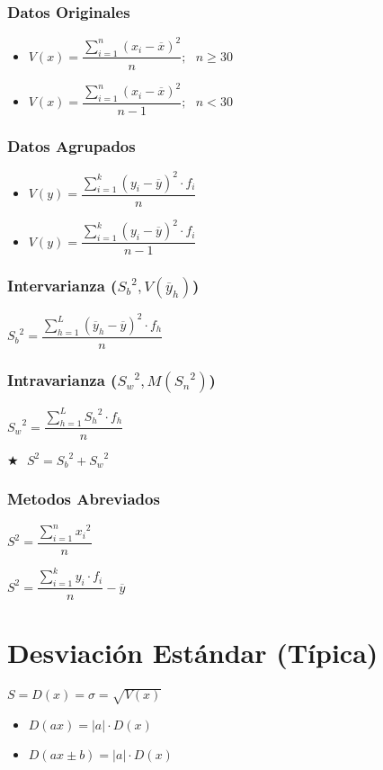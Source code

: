 \documentclass[10pt,letterpaper]{article}
\begin{document}
\begin{multicols}{3}
\subsubsection*{Datos Originales}
\begin{itemize}
\item $V(x)=\dfrac{\displaystyle\sum_{i=1}^{n}(x_i-\overline{x})^2}{n}; \text{ }n\geq 30$
\item $V(x)=\dfrac{\displaystyle\sum_{i=1}^{n}(x_i-\overline{x})^2}{n-1}; \text{ }n <30$
\end{itemize}
\columnbreak
\subsubsection*{Datos Agrupados}
\begin{itemize}
\item $V(y)=\dfrac{\displaystyle\sum_{i=1}^{k}(y_i-\overline{y})^2\cdot f_i}{n}$
\item $V(y)=\dfrac{\displaystyle\sum_{i=1}^{k}(y_i-\overline{y})^2\cdot f_i}{n-1}$
\end{itemize}
\columnbreak
\subsubsection*{Intervarianza (${S_b}^2,V(\overline{y}_h)$)}
${S_b}^2=\dfrac{\displaystyle\sum_{h=1}^{L}(\overline{y}_h-\overline{y})^2\cdot f_h}{n}$
\subsubsection*{Intravarianza (${S_w}^2,M({S_n}^2)$)}
${S_w}^2=\dfrac{\displaystyle\sum_{h=1}^{L}{S_h}^2\cdot f_h}{n}$
\end{multicols}
$\bigstar\text{   } S^2={S_b}^2+{S_w}^2$
\subsubsection*{Metodos Abreviados}
\begin{multicols}{2}
\begin{center}
$S^2 =\dfrac{\displaystyle\sum_{i=1}^{n}{x_i}^2}{n}$
\end{center}
\columnbreak
\begin{center}
$S^2 =\dfrac{\displaystyle\sum_{i=1}^{k}{y_i}\cdot f_i}{n}-\overline{y}$
\end{center}
\end{multicols}
\section{Desviación Estándar (Típica)}
$S=D(x)=\sigma=\sqrt{V(x)}$
\begin{itemize}
\item $D(ax)=|a|\cdot D(x)$
\item $D(ax\pm b)=|a|\cdot D(x)$
\end{itemize}
\end{document}
